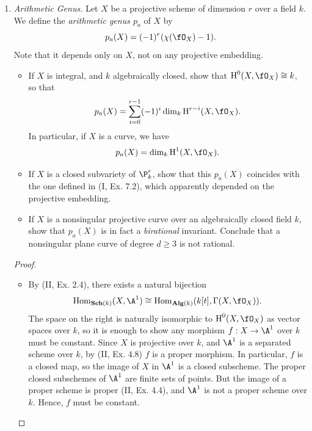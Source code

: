 \documentclass[a4paper]{article}
\begin{document}
\begin{enumerate} [label=\textbf{\arabic*.}, leftmargin=0em]
  \item \textit{Arithmetic Genus.} Let $X$ be a projective scheme of dimension $r$ over a field $k$. We define the \textit{arithmetic genus $p_a$} of $X$ by
        \begin{equation*}
          p_a(X) = (-1)^r (\chi(\fO_X) - 1).
        \end{equation*}
        Note that it depends only on $X$, not on any projective embedding.
        \begin{itemize}
          \item[(a)] If $X$ is integral, and $k$ algebraically closed, show that $\cH^0(X, \fO_X) \cong k$, so that
                \begin{equation*}
                  p_a(X) = \sum_{i = 0}^{r - 1} (-1)^i \dim_k{\cH^{r-i}(X, \fO_X)}.
                \end{equation*}
                In particular, if $X$ is a curve, we have
                \begin{equation*}
                  p_a(X) = \dim_k{\cH^1(X, \fO_X)}.
                \end{equation*}
          \item[(b)] If $X$ is a closed subvariety of $\P_k^r$, show that this $p_a(X)$ coincides with the one defined in (I, Ex. 7.2), which apparently depended on the projective embedding.
          \item[(c)] If $X$ is a nonsingular projective curve over an algebraically closed field $k$, show that $p_a(X)$ is in fact a \textit{birational} invariant. Conclude that a nonsingular plane curve of degree $d \geq 3$ is not rational.
        \end{itemize}

        \begin{proof} $ $ \vspace{0pt}
          \begin{itemize} [leftmargin=0cm]
            \item[(a)] By (II, Ex. 2.4), there exists a natural bijection
                  \begin{equation*}
                    \Hom_{\ckSch{k}}(X, \A^1) \cong \Hom_{\ckAlg{k}}(k[t], \Gamma(X, \fO_X)).
                  \end{equation*}
                  The space on the right is naturally isomorphic to $\cH^0(X, \fO_X)$ as vector spaces over $k$, so it is enough to show any morphism $f : X \to \A^1$ over $k$ must be constant.
                  Since $X$ is projective over $k$, and $\A^1$ is a separated scheme over $k$, by (II, Ex. 4.8) $f$ is a proper morphism.
                  In particular, $f$ is a closed map, so the image of $X$ in $\A^1$ is a closed subscheme.
                  The proper closed subschemes of $\A^1$ are finite sets of points.
                  But the image of a proper scheme is proper (II, Ex. 4.4), and $\A^1$ is not a proper scheme over $k$.
                  Hence, $f$ must be constant.


\end{itemize}
\end{proof}
\end{enumerate}
\end{document}
